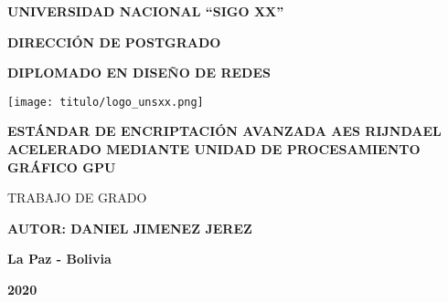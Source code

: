 \documentclass[../main/main.tex]{subfiles}
\begin{document}
  \thispagestyle{empty}
  \vspace*{-0.5cm}

  \begin{center}
    \LARGE\MakeUppercase{\textbf{Universidad Nacional ``Sigo XX''}}

    \vspace{0.5cm}
    \Large\MakeUppercase{\textbf{Dirección de Postgrado}}

    \vspace{0.5cm}
    \large\MakeUppercase{\textbf{Diplomado en Diseño de Redes}}

    \vspace{1.3cm}
    \texttt{[image: titulo/logo\_unsxx.png]}
    \vspace{1.3cm}

    \Large\MakeUppercase{\textbf{Estándar de Encriptación Avanzada AES Rijndael acelerado mediante Unidad de Procesamiento Gráfico GPU}}

    \vspace{0.4cm}
    \large\MakeUppercase{Trabajo de Grado}

    \vspace{1cm}
    \large{\MakeUppercase{\textbf{Autor: Daniel Jimenez Jerez}}}
    \vspace{1cm}

    \large{\textbf{La Paz - Bolivia}}

    \large{\textbf{2020}}
  \end{center}
\end{document}
